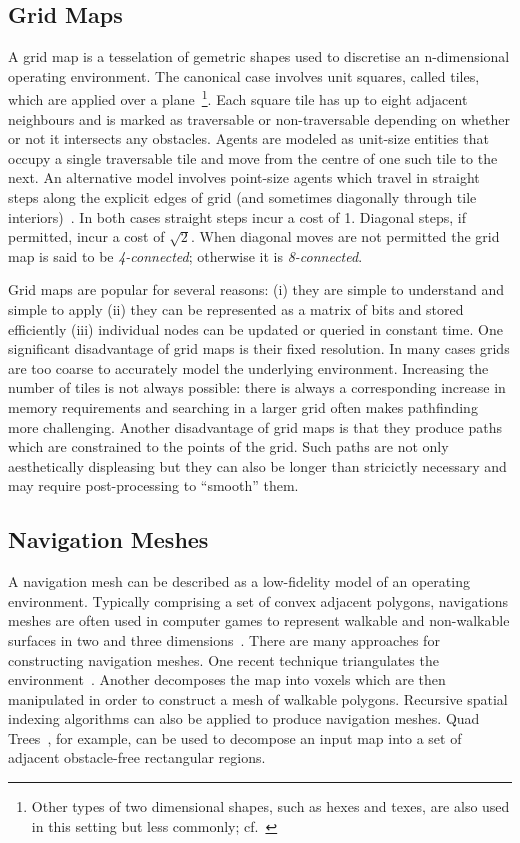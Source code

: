 \subsection{Grid Maps}
\label{cha::lit::graphs::grid}
A grid map is a tesselation of gemetric shapes used to discretise an n-dimensional
operating environment. The canonical case involves unit squares, called tiles, 
which are applied over a plane~\footnote{Other types of two dimensional shapes,
such as hexes and texes, are also used in this setting but less commonly; cf.~\citep{yap02}}.
Each square tile has up to eight adjacent neighbours and is marked 
as traversable or non-traversable depending on whether or not it
intersects any obstacles.  Agents are modeled as unit-size entities that
occupy a single traversable tile and move from the centre of one such tile 
to the next.  
An alternative model involves point-size agents which travel in straight 
steps along the explicit edges of grid (and sometimes diagonally through 
tile interiors)~\cite{nash07}.
In both cases straight steps incur a cost of 1. Diagonal steps, if permitted, 
incur a cost of $\sqrt{2}$.  When diagonal moves are not permitted the grid map 
is said to be \emph{4-connected}; otherwise it is \emph{8-connected}.  

Grid maps are popular for several reasons: (i) they are simple to understand 
and simple to apply (ii) they can be represented as a matrix of bits and stored
efficiently (iii) individual nodes can be updated or queried in constant time.
One significant disadvantage of grid maps is their fixed resolution. In many cases 
grids are too coarse to accurately model the underlying environment. Increasing the
number of tiles is not always possible: there is always a corresponding increase in
memory requirements and searching in a larger grid often makes pathfinding more 
challenging.
Another disadvantage of grid maps is that they produce paths which are
constrained to the points of the grid. Such paths are not only aesthetically
displeasing but they can also be longer than stricictly necessary and may
require post-processing to ``smooth'' them.

\subsection{Navigation Meshes}
\label{cha::lit::graphs::nav}
A navigation mesh can be described as a low-fidelity model of an operating environment.
Typically comprising a set of convex adjacent polygons, navigations meshes are
often used in computer games to represent walkable and non-walkable surfaces in
two and three dimensions~\citep{snook00,tozour02}.
There are many approaches for constructing navigation meshes.
One recent technique triangulates the environment~\citep{demyen07,kallmann10}.  
Another decomposes the map into voxels which are then manipulated in order to construct a 
mesh of walkable polygons. 
Recursive spatial indexing algorithms can also be applied to produce navigation meshes. 
Quad Trees~\citep{finkel74,samet85}, for example, can be used to decompose an input
map into a set of adjacent obstacle-free rectangular regions. 

